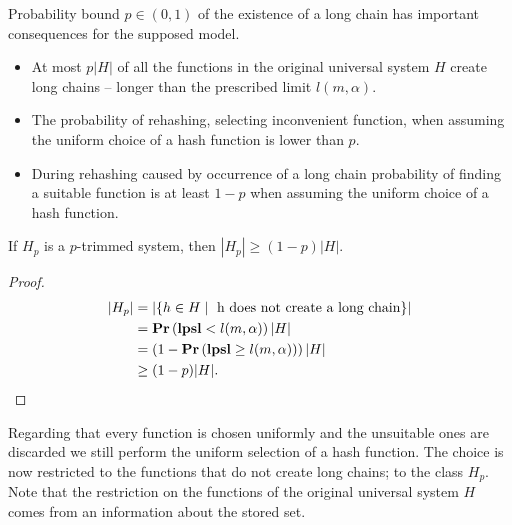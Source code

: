 Probability bound $p \in (0, 1)$ of the existence of a long chain has important consequences for the supposed model.
\begin{itemize}
\item At most $p|H|$ of all the functions in the original universal system $H$ create long chains -- longer than the prescribed limit $l(m, \alpha)$. 
\item The probability of rehashing, selecting inconvenient function, when assuming the uniform choice of a hash function is lower than $p$.
\item During rehashing caused by occurrence of a long chain probability of finding a suitable function is at least $1 - p$ when assuming the uniform choice of a hash function.
\end{itemize}

\begin{lemma}
\label{lemma-size-of-trimmed-system}
If $H_p$ is a $p$-trimmed system, then $|H_p| \geq (1 - p)|H|$.
\end{lemma}
\begin{proof}
\[
\begin{split}
|H_p|
	& = |\lbrace h \in H \mid \text{ h does not create a long chain} \rbrace| \\
	& =\mathbf{Pr}\left(\mathbf{lpsl} < l(m, \alpha)\right) |H| \\
	& = \left(1 - \mathbf{Pr}\left(\mathbf{lpsl} \geq l(m, \alpha)\right)\right) |H| \\
	& \geq (1 - p)|H| \text{.}
\end{split}
\]
\end{proof}

Regarding that every function is chosen uniformly and the unsuitable ones are discarded we still perform the uniform selection of a hash function. The choice is now restricted to the functions that do not create long chains; to the class $H_p$. Note that the restriction on the functions of the original universal system $H$ comes from an information about the stored set.

